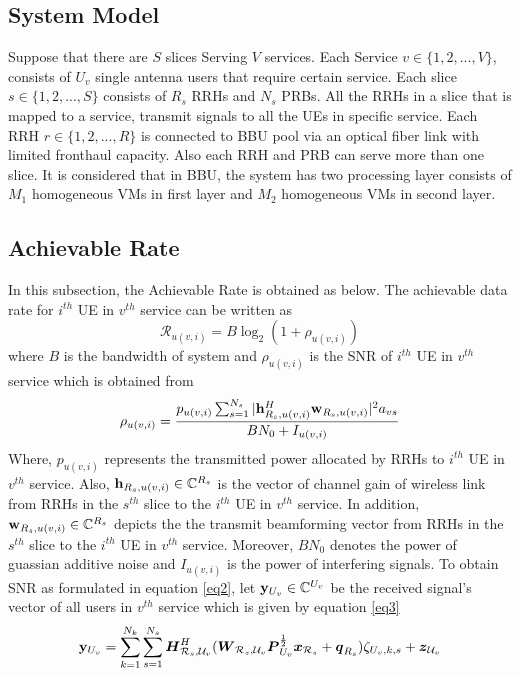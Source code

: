 \documentclass[conference]{IEEEtran}
\begin{document}
\subsection{System Model}
Suppose that there are $S$ slices Serving $V$ services. Each Service $v\in \{1,2,...,V \} $, consists of $U_v$ single antenna users that require certain service. Each slice $s \in \{1,2,...,S \}$ consists of $R_s$ RRHs and $N_s$ PRBs. All the RRHs in a slice that is mapped to a service, transmit signals to all the UEs in specific service. Each RRH $r \in \{1,2,...,R \}$ is connected to BBU pool via an optical fiber link with limited fronthaul capacity. Also each RRH and PRB can serve more than one slice. It is considered that in BBU, the system has two processing layer consists of $M_1$ homogeneous VMs in first layer and $M_2$ homogeneous VMs in second layer.
\subsection{Achievable Rate}
In this subsection, the Achievable Rate is obtained as below.
The achievable data rate for $i^{th}$ UE in $v^{th}$ service can be written as 
\begin{equation}\label{eq1}
\mathcal{R}_{u(v,i)} = B \log_2({1+ \rho_{u(v,i)}})
\end{equation}
where $B$ is the bandwidth of system and $\rho_{u(v,i)}$ is the SNR of $i^{th}$ UE in $v^{th}$ service which is obtained from 
\begin{equation}\label{eq2}
\rho_{u(v,i)} =  \frac{p_{u(v,i)}\sum_{s=1}^{N_s}|\bold{h}_{R_s,u(v,i)}^H \bold{w}_{R_s,u(v,i)}|^2 a_{vs}}{BN_0 + I_{u(v,i)}}
\end{equation}
Where, $p_{u(v,i)}$ represents the transmitted power allocated by RRHs to $i^{th}$ UE in $v^{th}$ service. Also, 
$\bold{h}_{R_s,u(v,i)} \in \mathbb{C}^{{R}_s}$ is the vector of channel gain of wireless link from RRHs in the $s^{th}$ slice to the $i^{th}$ UE in $v^{th}$ service. In addition, $\bold{w}_{R_s,u(v,i)} \in \mathbb{C}^{{R}_s}$ depicts the the transmit beamforming vector from RRHs in the $s^{th}$ slice to the $i^{th}$ UE in $v^{th}$ service. Moreover, $BN_0$ denotes the power of guassian additive noise and $I_{u(v,i)}$ is the power of interfering signals. 
To obtain SNR as formulated in equation \eqref{eq2}, let $\bold{y}_{U_v}\in \mathbb{C}^{U_v} $ be the received signal's vector of all users in $v^{th}$ service which is given by equation \eqref{eq3}
\begin{equation}\label{eq3}
\bold{y}_{U_v} = \sum_{k=1}^{N_k}\sum_{s = 1}^{N_s} \boldsymbol{H}^H_{\mathcal{R}_s,\mathcal{U}_v}(\boldsymbol{W}_{\mathcal{R}_s,\mathcal{U}_v}\boldsymbol{P}_{U_v}^{\frac{1}{2}}\boldsymbol{x}_{\mathcal{R}_s}+ \boldsymbol{q}_{R_s}) \zeta_{U_v,k,s}+ \boldsymbol{z}_{\mathcal{U}_v}
\end{equation}
\end{document}
